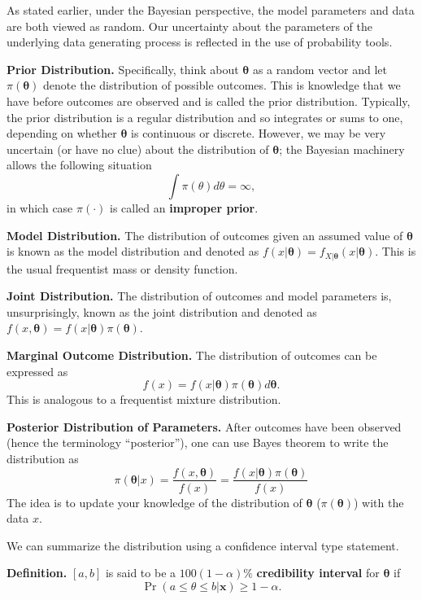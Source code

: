 \documentclass[]{book}
\theoremstyle{definition}
\theoremstyle{definition}
\theoremstyle{definition}
\theoremstyle{remark}
\begin{document}
As stated earlier, under the Bayesian perspective, the model parameters
and data are both viewed as random. Our uncertainty about the parameters
of the underlying data generating process is reflected in the use of
probability tools.

\textbf{Prior Distribution.} Specifically, think about
\(\boldsymbol \theta\) as a random vector and let
\(\pi(\boldsymbol \theta)\) denote the distribution of possible
outcomes. This is knowledge that we have before outcomes are observed
and is called the prior distribution. Typically, the prior distribution
is a regular distribution and so integrates or sums to one, depending on
whether \(\boldsymbol \theta\) is continuous or discrete. However, we
may be very uncertain (or have no clue) about the distribution of
\(\boldsymbol \theta\); the Bayesian machinery allows the following
situation \[\int \pi(\theta) d\theta = \infty,\] in which case
\(\pi(\cdot)\) is called an \textbf{improper prior}.

\textbf{Model Distribution.} The distribution of outcomes given an
assumed value of \(\boldsymbol \theta\) is known as the model
distribution and denoted as
\(f(x | \boldsymbol \theta) = f_{X|\boldsymbol \theta} (x|\boldsymbol \theta )\).
This is the usual frequentist mass or density function.

\textbf{Joint Distribution.} The distribution of outcomes and model
parameters is, unsurprisingly, known as the joint distribution and
denoted as
\(f(x , \boldsymbol \theta) = f(x|\boldsymbol \theta )\pi(\boldsymbol \theta)\).

\textbf{Marginal Outcome Distribution.} The distribution of outcomes can
be expressed as
\[f(x) = f(x | \boldsymbol \theta)\pi(\boldsymbol \theta) d\boldsymbol \theta.\]
This is analogous to a frequentist mixture distribution.

\textbf{Posterior Distribution of Parameters.} After outcomes have been
observed (hence the terminology ``posterior''), one can use Bayes
theorem to write the distribution as
\[\pi(\boldsymbol \theta | x) =\frac{f(x , \boldsymbol \theta)}{f(x)} =\frac{f(x|\boldsymbol \theta )\pi(\boldsymbol \theta)}{f(x)}\]
The idea is to update your knowledge of the distribution of
\(\boldsymbol \theta\) (\(\pi(\boldsymbol \theta)\)) with the data
\(x\).

We can summarize the distribution using a confidence interval type
statement.

\textbf{Definition.} \([a,b]\) is said to be a \(100(1-\alpha)\%\)
\textbf{credibility interval} for \(\boldsymbol \theta\) if
\[\Pr (a \le \theta \le b | \mathbf{x}) \ge 1- \alpha.\]
\end{document}
